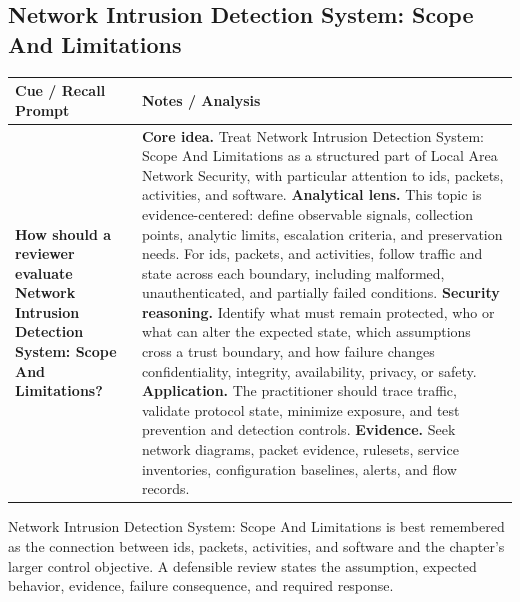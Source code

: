 \documentclass[11pt]{article}
\newcommand{\CornellHeader}{%
\rowcolor{Navy}\color{white}\bfseries Cue / Recall Prompt & \color{white}\bfseries Notes / Analysis\\\hline}
\newcommand{\CornellRow}[2]{%
\cellcolor{CueGray}\RaggedRight\textbf{#1} & \RaggedRight #2\\\hline}
\begin{document}
\subsection*{Network Intrusion Detection System: Scope And Limitations}
\begin{longtable}{>{\RaggedRight\arraybackslash}p{}|>{\RaggedRight\arraybackslash}p{}}
\CornellHeader
\CornellRow{How should a reviewer evaluate Network Intrusion Detection System: Scope And Limitations?}{\textbf{Core idea.} Treat Network Intrusion Detection System: Scope And Limitations as a structured part of Local Area Network Security, with particular attention to ids, packets, activities, and software. \textbf{Analytical lens.} This topic is evidence-centered: define observable signals, collection points, analytic limits, escalation criteria, and preservation needs. For ids, packets, and activities, follow traffic and state across each boundary, including malformed, unauthenticated, and partially failed conditions. \textbf{Security reasoning.} Identify what must remain protected, who or what can alter the expected state, which assumptions cross a trust boundary, and how failure changes confidentiality, integrity, availability, privacy, or safety. \textbf{Application.} The practitioner should trace traffic, validate protocol state, minimize exposure, and test prevention and detection controls. \textbf{Evidence.} Seek network diagrams, packet evidence, rulesets, service inventories, configuration baselines, alerts, and flow records.}
\end{longtable}
\begin{topicsummary}
Network Intrusion Detection System: Scope And Limitations is best remembered as the connection between ids, packets, activities, and software and the chapter's larger control objective. A defensible review states the assumption, expected behavior, evidence, failure consequence, and required response.
\end{topicsummary}
\end{document}
